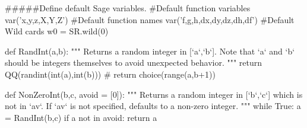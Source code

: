 \documentclass{ximeraXloud}
\begin{document}
\begin{sagesilent}
#####Define default Sage variables.
#Default function variables
var('x,y,z,X,Y,Z')
#Default function names
var('f,g,h,dx,dy,dz,dh,df')
#Default Wild cards
w0 = SR.wild(0)

def RandInt(a,b):
    """ Returns a random integer in [`a`,`b`]. Note that `a` and `b` should be integers themselves to avoid unexpected behavior.
    """
    return QQ(randint(int(a),int(b)))
    # return choice(range(a,b+1))

def NonZeroInt(b,c, avoid = [0]):
    """ Returns a random integer in [`b`,`c`] which is not in `av`. 
        If `av` is not specified, defaults to a non-zero integer.
    """
    while True:
        a = RandInt(b,c)
        if a not in avoid:
            return a

\end{sagesilent}
\end{document}
